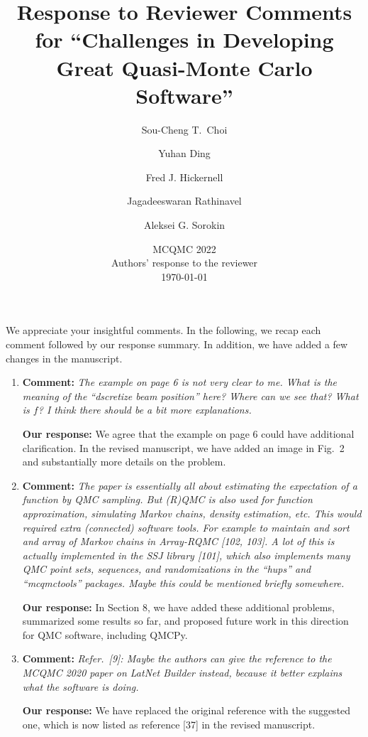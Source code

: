 \documentclass{article}[12pt]
\title{Response to Reviewer Comments for  ``Challenges in Developing Great Quasi-Monte Carlo Software''}
\author{Sou-Cheng T.~Choi \and Yuhan Ding \and Fred J. Hickernell \and Jagadeeswaran  Rathinavel \and Aleksei G. Sorokin}
\date{MCQMC 2022
   \\[1ex]  Authors' response to the reviewer
   \\[1ex] \today}
\begin{document}
\maketitle    

We appreciate your insightful comments.  In the following, we recap each comment followed by our response summary. In addition, we have added a few changes in the manuscript. 

\begin{enumerate}
    \item \textbf{Comment:} \textit{The example on page 6 is not very clear to me. What is the meaning of the ``dscretize
beam position'' here? Where can we see that? What is $f$? I think there should be a
bit more explanations.}

\textbf{Our response:} We agree that the example on page 6 could have additional clarification. In the revised manuscript, we have added an image in Fig.~2 and  substantially more details on the problem. 

    \item \textbf{Comment:} \textit{The paper is essentially all about estimating the expectation of a function by QMC sampling.
But (R)QMC is also used for function approximation, simulating Markov chains,
density estimation, etc. This would required extra (connected) software tools. For example
to maintain and sort and array of Markov chains in Array-RQMC [102, 103].
A lot of this is actually implemented in the SSJ library [101], which also implements
many QMC point sets, sequences, and randomizations in the “hups” and “mcqmctools”
packages. Maybe this could be mentioned briefly somewhere.}

\textbf{Our response:} In Section 8, we have added these additional problems, summarized some results so far, and proposed future work in this direction for  QMC software, including QMCPy.

    \item \textbf{Comment:} \textit{Refer.\ [9]: Maybe the authors can give the reference to the MCQMC 2020 paper on
LatNet Builder instead, because it better explains what the software is doing.}
    
       \textbf{Our response:} We have replaced the original reference with the suggested one, which is now listed as reference [37] in the revised manuscript.
    

\end{enumerate}
\end{document}
